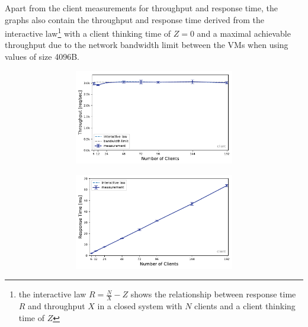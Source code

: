 \documentclass[report.tex]{subfiles}
\begin{document}
Apart from the client measurements for throughput and response time, the graphs also contain the throughput and response time derived from the interactive law\footnote{the interactive law $R = \frac{N}{X} - Z$ shows the relationship between response time $R$ and throughput $X$ in a closed system with $N$ clients and a client thinking time of $Z$} with a client thinking time of $Z=0$ and a maximal achievable throughput due to the network bandwidth limit between the VMs when using values of size 4096B.

\begin{figure}[H]
\begin{subfigure}{\linewidth}
	\begin{subfigure}[b]{.49\linewidth}
		\centering
		\includegraphics[width=\linewidth]{data/exp21_ro_tp_nc.pdf}
	\end{subfigure}\hfill
	\begin{subfigure}[b]{.49\linewidth}
		\centering
		\includegraphics[width=\linewidth]{data/exp21_ro_rt_nc.pdf}
	\end{subfigure}%

\end{subfigure}
\end{figure}
\end{document}

